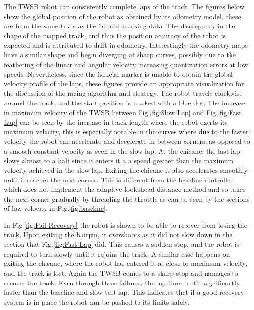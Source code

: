     The TWSB robot can consistently complete laps of the track. The figures below show the global position of the robot 
    as obtained by its odometry model, these are from the same trials as the fiducial tracking data. The discrepancy in the shape of the mapped track, and thus the 
    position accuracy of the robot is expected and is attributed to drift in odometry. Interestingly the odometry maps have a similar shape and begin diverging at sharp 
    curves, possibly due to the feathering of the linear and angular velocity increasing quantization errors at low speeds. Nevertheless, since the fiducial marker  
    is unable to obtain the global velocity profile of the laps, these figures provide an appropriate visualization for the discussion of the racing algorithm and strategy. 
    The robot travels clockwise around the track, and the start position is marked with a blue dot. The increase in maximum velocity of the TWSB between 
    Fig.\ref{fig:Slow Lap} and Fig.\ref{fig:Fast Lap} can be seen by the increase in track length where the robot exerts its maximum velocity, this is especially notable in the curves 
    where due to the faster velocity the robot can accelerate and decelerate in between corners, as opposed to a smooth constant velocity as seen in the slow lap. 
    At the chicane, the fast lap slows almost to a halt since it enters it a a speed greater than the maximum velocity achieved in the slow lap. Exiting the chicane it also accelerates smoothly 
    until it reaches the next corner. This is different from the baseline controller which does not implement the adaptive lookahead distance method and so takes the next corner gradually
    by threading the throttle as can be seen by the sections of low velocity in Fig.\ref{fig:baseline}. 

    In Fig.\ref{fig:Fail Recovery} the robot is shown to be able to recover from losing the track. Upon exiting the hairpin, it overshoots as 
    it did not slow down in the section that Fig.\ref{fig:Fast Lap} did. This causes a sudden stop, and the robot is required to turn slowly until it rejoins the track. 
    A similar case happens on exiting the chicane, where the robot has entered it at close to maximum velocity, and the track is lost. Again the TWSB comes to a sharp stop and manages to recover the 
    track. Even through these failures, the lap time is still significantly faster than the baseline and slow test lap. This indicates that if a good recovery system is in place 
    the robot can be pushed to its limits safely.

